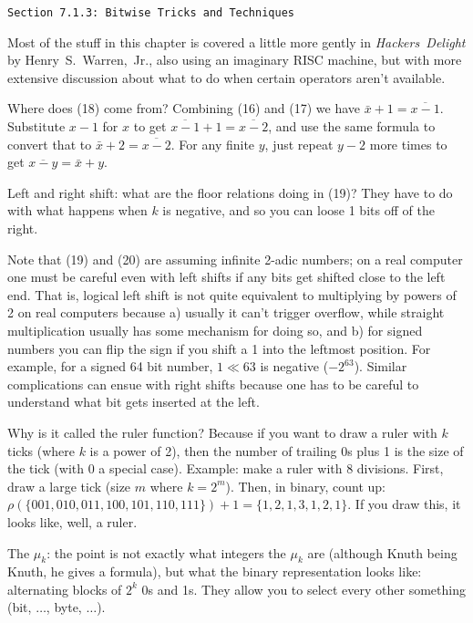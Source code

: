 \vfil\break

\vskip 0.3in
\centerline{\tt Section 7.1.3: Bitwise Tricks and Techniques}
\vskip0.2in

Most of the stuff in this chapter is covered a little more gently
in {\it Hackers~Delight} by Henry~S.~Warren,~Jr., also using an imaginary RISC machine,
but with more extensive discussion about what to do when certain
operators aren't available.

\vskip 0.1in 

\noindent [p 135] Where does (18) come from?  Combining (16) and
(17) we have $\bar x + 1 = \overline{x - 1}$.  Substitute $x-1$ for $x$
to get $\overline{x - 1} + 1 = \overline{x - 2}$, and use the same
formula to convert that to $\bar x + 2 = \overline{x - 2}$.  For any
finite $y$, just repeat $y-2$ more times to get $\overline{x - y} = \bar x + y$.

\vskip 0.08in \noindent [p 135] Left and right shift: what are the floor
relations doing in (19)?  They have to do with what happens when $k$
is negative, and so you can loose 1 bits off of the right.

Note that (19) and (20) are assuming infinite 2-adic numbers; on a real
computer one must be careful even with left shifts if any bits get shifted
close to the left end.  That is, logical left shift is not quite equivalent
to multiplying by powers of 2 on real computers because a) usually
it can't trigger overflow, while straight multiplication usually has
some mechanism for doing so, and b) for signed numbers you can
flip the sign if you shift a 1 into the leftmost position.  For example,
for a signed 64 bit number, $1 \ll 63$ is negative ($-2^{63}$).
Similar complications can ensue with right shifts because one has to
be careful to understand what bit gets inserted at the left.

\vskip 0.1in 

\noindent [p 140] Why is it called the ruler function?
Because if you want to draw a ruler with $k$ ticks (where $k$ is
a power of 2), then the number of trailing 0s plus 1 is the size of the
tick (with 0 a special case).  Example: make a ruler with 8
divisions. First, draw a large tick (size $m$ where $k = 2^m$).  
Then, in binary, count up:
$\rho\left(\{001, 010, 011, 100, 101, 110, 111\}\right) + 1 = 
\{1, 2, 1, 3, 1, 2, 1\}$.  If you draw this, it looks like, well,
a ruler. 

\vskip 0.08in \noindent [p 141] The $\mu_k$: the point is not 
exactly what integers the $\mu_k$ are (although Knuth being
Knuth, he gives a formula), but what the binary representation
looks like: alternating blocks of $2^k$ 0s and 1s.  They allow
you to select every other something (bit, $\ldots$, byte, $\ldots$).

